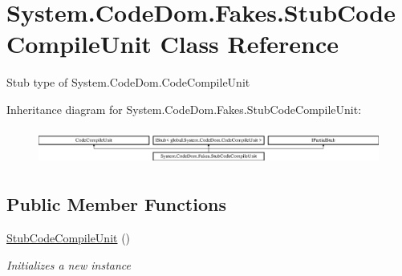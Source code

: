 \hypertarget{class_system_1_1_code_dom_1_1_fakes_1_1_stub_code_compile_unit}{\section{System.\-Code\-Dom.\-Fakes.\-Stub\-Code\-Compile\-Unit Class Reference}
\label{class_system_1_1_code_dom_1_1_fakes_1_1_stub_code_compile_unit}
}


Stub type of System.\-Code\-Dom.\-Code\-Compile\-Unit 


Inheritance diagram for System.\-Code\-Dom.\-Fakes.\-Stub\-Code\-Compile\-Unit\-:\begin{figure}[H]
\begin{center}
\leavevmode
\includegraphics[height=1.208199cm]{class_system_1_1_code_dom_1_1_fakes_1_1_stub_code_compile_unit}
\end{center}
\end{figure}
\subsection*{Public Member Functions}
\begin{DoxyCompactItemize}
\item 
\hyperlink{class_system_1_1_code_dom_1_1_fakes_1_1_stub_code_compile_unit_a898668ef8f499a45b7b88e9d1574d9dd}{Stub\-Code\-Compile\-Unit} ()
\begin{DoxyCompactList}\small\item\em Initializes a new instance\end{DoxyCompactList}\end{DoxyCompactItemize}
